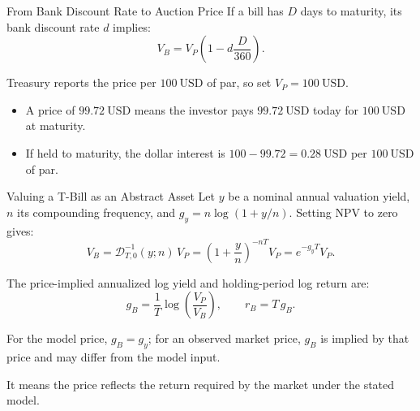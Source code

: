 \documentclass[aspectratio=169,11pt]{beamer}
\begin{document}
\begin{frame}{From Bank Discount Rate to Auction Price}
  If a bill has $D$ days to maturity, its bank discount rate $d$ implies:
  \[
    \boxed{V_B=V_P\left(1-d\frac{D}{360}\right)} .
  \]

  \vspace{0.4em}
  Treasury reports the price per $100~\mathrm{USD}$ of par, so set
  $V_P=100~\mathrm{USD}$.

  \vspace{0.5em}
  \begin{itemize}\setlength{\itemsep}{0.45em}
    \item A price of $99.72~\mathrm{USD}$ means the investor pays
      $99.72~\mathrm{USD}$ today for $100~\mathrm{USD}$ at maturity.
    \item If held to maturity, the dollar interest is
      $100-99.72=0.28~\mathrm{USD}$ per $100~\mathrm{USD}$ of par.
  \end{itemize}


\end{frame}

\begin{frame}{Valuing a T-Bill as an Abstract Asset}
  Let $y$ be a nominal annual valuation yield, $n$ its compounding frequency,
  and $g_y=n\log(1+y/n)$. Setting NPV to zero gives:
  \[
    V_B=\mathcal D_{T,0}^{-1}(y;n)\,V_P=\left(1+\frac{y}{n}\right)^{-nT}V_P=e^{-g_yT}V_P .
  \]

  The price-implied annualized log yield and holding-period log return are:
  \[
    g_B=\frac{1}{T}\log\left(\frac{V_P}{V_B}\right),
    \qquad r_B=T\,g_B .
  \]

  For the model price, $g_B=g_y$; for an observed market price, $g_B$ is implied
  by that price and may differ from the model input.

  \vspace{0.4em}
   It means the price
  reflects the return required by the market under the stated model.
\end{frame}
\end{document}
